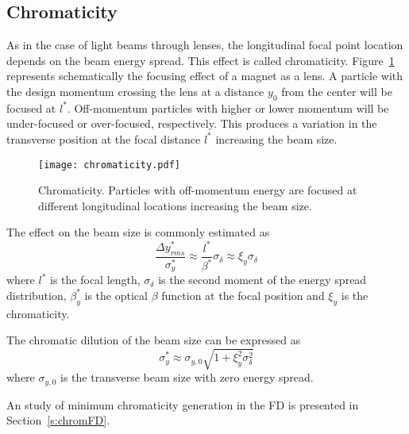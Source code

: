 \subsection{Chromaticity}
As in the case of light beams through lenses, the longitudinal focal point location depends on the beam energy spread. This effect is called chromaticity.  Figure~\ref{f:chrom} represents schematically the focusing effect of a magnet as a lens. A particle with the design momentum crossing the lens at a distance $y_0$ from the center will be focused at $l^*$. Off-momentum particles with higher or lower momentum will be under-focused or over-focused, respectively. This produces a variation in the transverse position at the focal distance $l^*$ increasing the beam size.\par
\begin{figure}[!hbt]
\centering
\texttt{[image: chromaticity.pdf]}\caption{Chromaticity. Particles with off-momentum energy are focused at different longitudinal locations increasing the beam size.}\label{f:chrom}
\end{figure}
The effect on the beam size is commonly estimated as
\begin{equation}
 \frac{\Delta y^*_{rms}}{\sigma^*_y}\approx\frac{l^*}{\beta^*}\sigma_\delta\approx\xi_y\sigma_\delta
\end{equation}
where $l^*$ is the focal length, $\sigma_\delta$ is the second moment of the energy spread distribution, $\beta_y^*$ is the optical $\beta$ function at the focal position and $\xi_y$ is the chromaticity.\par
The chromatic dilution of the beam size can be expressed as 
\begin{equation}
 \sigma^*_y\approx\sigma_{y,0}\sqrt{1+\xi_y^2\sigma^2_\delta}
\end{equation}
where $\sigma_{y,0}$ is the transverse beam size with zero energy spread.\par
An study of minimum chromaticity generation in the FD is presented in Section~\ref{s:chromFD}.

